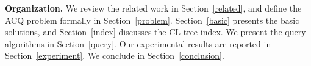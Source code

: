 
{\bf Organization.} We review the related work in Section~\ref{related}, and define the ACQ problem formally in Section~\ref{problem}. Section~\ref{basic} presents the basic solutions, and Section~\ref{index} discusses the CL-tree index.
We present the query algorithms in Section~\ref{query}.
Our experimental results are reported in Section~\ref{experiment}.
We conclude in Section~\ref{conclusion}.






